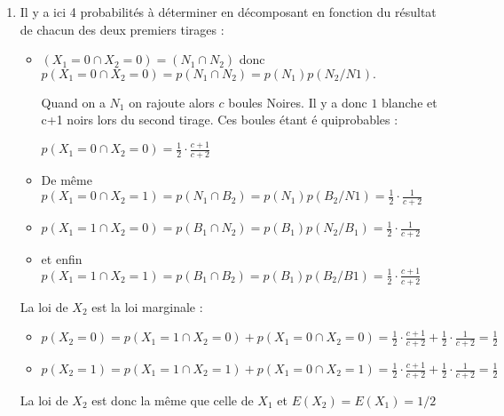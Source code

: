 \documentclass[a4paper, 11pt,reqno]{article}
\begin{document}
\begin{correction}
\begin{enumerate}
\item Il y a ici 4 probabilit\'{e}s \`{a} d\'{e}terminer en d\'{e}composant
en fonction du r\'{e}sultat de chacun des deux premiers tirages :

\begin{itemize}
\item $\left( X_{1}=0\cap X_{2}=0\right) =\left( N_{1}\cap N_{2}\right) $
donc $p\left( X_{1}=0\cap X_{2}=0\right) =p\left( N_{1}\cap N_{2}\right)
=p\left( N_{1}\right) p\left( N_{2}/N1\right) .$

Quand on a $N_{1}$ on rajoute alors $c$ boules Noires. Il y a donc $1$
blanche et c+1 noirs lors du second tirage. Ces boules \'{e}tant \'{e}%
quiprobables :

$p\left( X_{1}=0\cap X_{2}=0\right) =\displaystyle
\frac{1}{2}\cdot \frac{c+1}{c+2}$

\item De m\^{e}me $p\left( X_{1}=0\cap X_{2}=1\right) =p\left( N_{1}\cap
B_{2}\right) =p\left( N_{1}\right) p\left( B_{2}/N1\right) =\displaystyle
\frac{1}{2}\cdot \frac{1}{c+2}$

\item $p\left( X_{1}=1\cap X_{2}=0\right) =p\left( B_{1}\cap N_{2}\right)
=p\left( B_{1}\right) p\left( N_{2}/B_{1}\right) =\displaystyle
\frac{1}{2}\cdot \frac{1}{c+2}$

\item et enfin $p\left( X_{1}=1\cap X_{2}=1\right) =p\left( B_{1}\cap
B_{2}\right) =p\left( B_{1}\right) p\left( B_{2}/B1\right) =\displaystyle
\frac{1}{2}\cdot \frac{c+1}{c+2}$
\end{itemize}

La loi de $X_{2}$ est la loi marginale :

\begin{itemize}
\item $p\left( X_{2}=0\right) =p\left( X_{1}=1\cap X_{2}=0\right) +p\left(
X_{1}=0\cap X_{2}=0\right) =\displaystyle
\frac{1}{2}\cdot \frac{c+1}{c+2}+\frac{1}{2}\cdot \frac{1}{c+2}=\frac{1}{2}$

\item $p\left( X_{2}=1\right) =p\left( X_{1}=1\cap X_{2}=1\right) +p\left(
X_{1}=0\cap X_{2}=1\right) =\displaystyle
\frac{1}{2}\cdot \frac{c+1}{c+2}+\frac{1}{2}\cdot \frac{1}{c+2}=\frac{1}{2}$
\end{itemize}

La loi de $X_{2}$ est donc la m\^{e}me que celle de $X_{1}$ et $E\left(
X_{2}\right) =E\left( X_{1}\right) =1/2$


\end{enumerate}
\end{correction}
\end{document}
